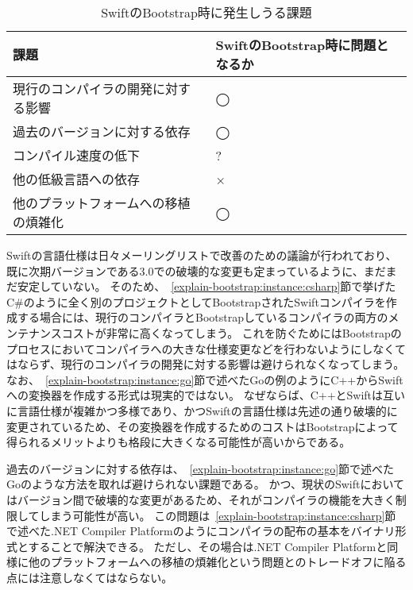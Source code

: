 \begin{table}[hb]
    \begin{center}
        \caption{SwiftのBootstrap時に発生しうる課題}
        \begin{tabular}{|m{10cm}|M{3cm}|}
            \hline
            課題 & SwiftのBootstrap時に問題となるか \\
            \hline
            現行のコンパイラの開発に対する影響 & ◯ \\
            \hline
            過去のバージョンに対する依存 & ◯ \\
            \hline
            コンパイル速度の低下 & ? \\
            \hline
            他の低級言語への依存 & × \\
            \hline
            他のプラットフォームへの移植の煩雑化 & ◯ \\
            \hline
        \end{tabular}
        \label{table:bootstrap-demerit}
    \end{center}
\end{table}

Swiftの言語仕様は日々メーリングリストで改善のための議論が行われており、既に次期バージョンである3.0での破壊的な変更も定まっているように、まだまだ安定していない。
そのため、~\ref{explain-bootstrap:instance:csharp}節で挙げたC\#のように全く別のプロジェクトとしてBootstrapされたSwiftコンパイラを作成する場合には、現行のコンパイラとBootstrapしているコンパイラの両方のメンテナンスコストが非常に高くなってしまう。
これを防ぐためにはBootstrapのプロセスにおいてコンパイラへの大きな仕様変更などを行わないようにしなくてはならず、現行のコンパイラの開発に対する影響は避けられなくなってしまう。
なお、~\ref{explain-bootstrap:instance:go}節で述べたGoの例のようにC++からSwiftへの変換器を作成する形式は現実的ではない。
なぜならば、C++とSwiftは互いに言語仕様が複雑かつ多様であり、かつSwiftの言語仕様は先述の通り破壊的に変更されているため、その変換器を作成するためのコストはBootstrapによって得られるメリットよりも格段に大きくなる可能性が高いからである。

過去のバージョンに対する依存は、~\ref{explain-bootstrap:instance:go}節で述べたGoのような方法を取れば避けられない課題である。
かつ、現状のSwiftにおいてはバージョン間で破壊的な変更があるため、それがコンパイラの機能を大きく制限してしまう可能性が高い。
この問題は~\ref{explain-bootstrap:instance:csharp}節で述べた.NET Compiler Platformのようにコンパイラの配布の基本をバイナリ形式とすることで解決できる。
ただし、その場合は.NET Compiler Platformと同様に他のプラットフォームへの移植の煩雑化という問題とのトレードオフに陥る点には注意しなくてはならない。

